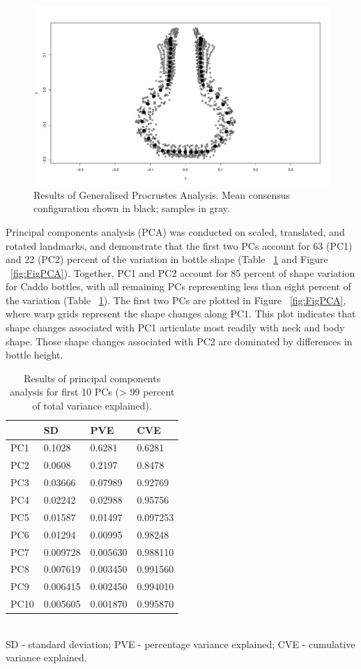 \documentclass[review]{elsarticle}
\begin{document}
\begin{figure}[htbp]\centering
\includegraphics[width=\linewidth]{gpa-all}
\caption{Results of Generalised Procrustes Analysis. Mean consensus configuration shown in black; samples in gray.}
\label{fig:FigGPA}
\end{figure}

Principal components analysis (PCA) was conducted on scaled, translated, and rotated landmarks, and demonstrate that the first two PCs account for 63 (PC1) and 22 (PC2) percent of the variation in bottle shape (Table ~\ref{tab:Tblpca1} and Figure ~\ref{fig:FigPCA}). Together, PC1 and PC2 account for 85 percent of shape variation for Caddo bottles, with all remaining PCs representing less than eight percent of the variation (Table ~\ref{tab:Tblpca1}). The first two PCs are plotted in Figure ~\ref{fig:FigPCA}, where warp grids represent the shape changes along PC1. This plot indicates that shape changes associated with PC1 articulate most readily with neck and body shape. Those shape changes associated with PC2 are dominated by differences in bottle height.

\begin{table}[htbp]\centering
\footnotesize
\caption{Results of principal components analysis for first 10 PCs (> 99 percent of total variance explained).}
\centering
\begin{tabular}{lp{2cm}p{2cm}p{2cm}}
\toprule
 & SD & PVE & CVE\\
\midrule
PC1 & 0.1028 & 0.6281 & 0.6281\\
PC2 & 0.0608 & 0.2197 & 0.8478\\
PC3 & 0.03666 & 0.07989 & 0.92769\\
PC4 & 0.02242 & 0.02988 & 0.95756\\
PC5 & 0.01587 & 0.01497 & 0.097253\\
PC6 & 0.01294 & 0.00995 & 0.98248\\
PC7 & 0.009728 & 0.005630 & 0.988110\\
PC8 & 0.007619 & 0.003450 & 0.991560\\
PC9 & 0.006415 & 0.002450 & 0.994010\\
PC10 & 0.005605 & 0.001870 & 0.995870\\
\bottomrule
\end{tabular}
\smallskip\\
SD - standard deviation; PVE - percentage variance explained; CVE - cumulative variance explained.
\label{tab:Tblpca1}
\end{table}
\end{document}
